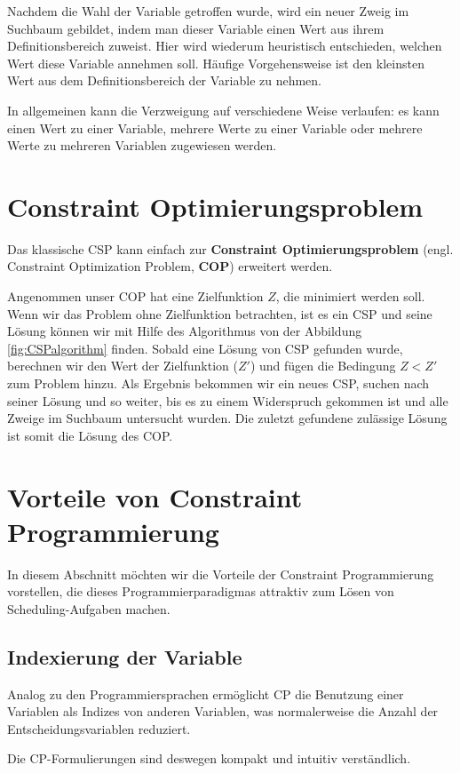 Nachdem die Wahl der Variable getroffen wurde, wird ein neuer Zweig im Suchbaum gebildet, indem man dieser Variable einen Wert aus ihrem Definitionsbereich zuweist. Hier wird wiederum heuristisch entschieden, welchen Wert diese Variable annehmen soll. Häufige Vorgehensweise ist den kleinsten Wert aus dem Definitionsbereich der Variable zu nehmen.

In allgemeinen kann die Verzweigung auf verschiedene Weise verlaufen: es kann einen Wert zu einer Variable, mehrere Werte zu einer Variable oder mehrere Werte zu mehreren Variablen zugewiesen werden.

\section{Constraint Optimierungsproblem}
Das klassische CSP kann einfach zur {\bf Constraint Optimierungsproblem} (engl. Constraint Optimization Problem, {\bf COP}) erweitert werden. 

Angenommen unser COP hat eine Zielfunktion $Z$, die minimiert werden soll. Wenn wir das Problem ohne Zielfunktion betrachten, ist es ein CSP und seine Lösung können wir mit Hilfe des Algorithmus von der Abbildung \ref{fig:CSPalgorithm} finden. Sobald eine Lösung von CSP gefunden wurde, berechnen wir den Wert der Zielfunktion ($Z'$) und fügen die Bedingung $Z<Z'$ zum Problem hinzu. Als Ergebnis bekommen wir ein neues CSP, suchen nach seiner Lösung und so weiter, bis es zu einem Widerspruch gekommen ist und alle Zweige im Suchbaum untersucht wurden. Die zuletzt gefundene zulässige Lösung  ist somit die Lösung des COP.

\section{Vorteile von Constraint Programmierung}

In diesem Abschnitt möchten wir die Vorteile der Constraint Programmierung vorstellen, die dieses Programmierparadigmas attraktiv zum Lösen von Scheduling-Aufgaben  machen.

\subsection {Indexierung der Variable}
Analog zu den Programmiersprachen ermöglicht CP die Benutzung einer Variablen als Indizes von anderen Variablen, was normalerweise die Anzahl der  Entscheidungsvariablen reduziert.

Die CP-Formulierungen sind deswegen kompakt und intuitiv verständlich.

